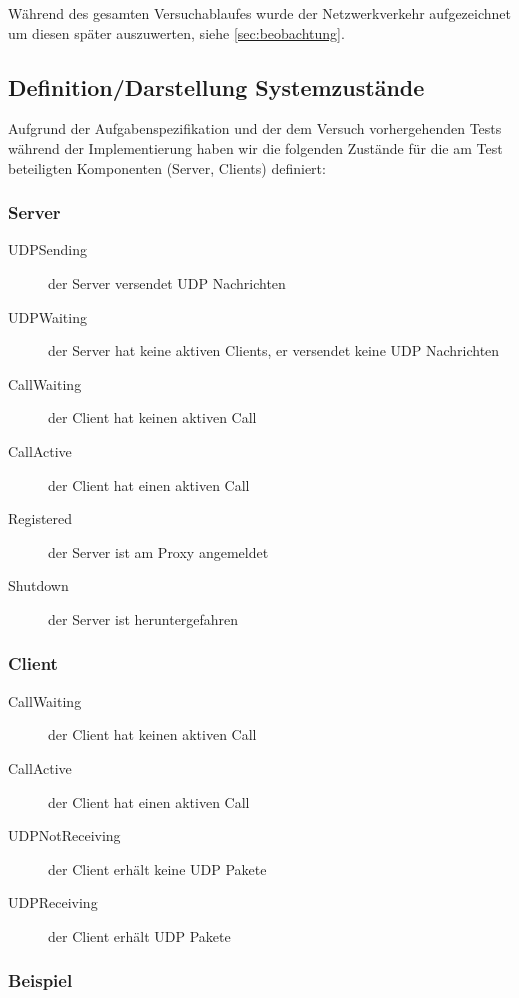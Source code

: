 \documentclass[10pt]{scrartcl}
\begin{document}
Während des gesamten Versuchablaufes wurde der Netzwerkverkehr aufgezeichnet um diesen später auszuwerten, siehe \ref{sec:beobachtung}.

\subsection{Definition/Darstellung Systemzustände}\label{subsec:systemzusatende}
Aufgrund der Aufgabenspezifikation und der dem Versuch vorhergehenden Tests während der Implementierung haben wir die folgenden Zustände für die am Test beteiligten Komponenten (Server, Clients) definiert:


\subsubsection{Server}
	\begin{description}
		\item[UDPSending] der Server versendet UDP Nachrichten
		\item[UDPWaiting] der Server hat keine aktiven Clients, er versendet keine UDP Nachrichten
		\item[CallWaiting] der Client hat keinen aktiven Call
		\item[CallActive] der Client hat einen aktiven Call
		\item[Registered] der Server ist am Proxy angemeldet
		\item[Shutdown] der Server ist heruntergefahren
	\end{description}
	
\subsubsection{Client}	
	\begin{description}
		\item[CallWaiting] der Client hat keinen aktiven Call
		\item[CallActive] der Client hat einen aktiven Call
		\item[UDPNotReceiving] der Client erhält keine UDP Pakete
		\item[UDPReceiving] der Client erhält UDP Pakete
	\end{description}	
	

	

\subsubsection{Beispiel}
\end{document}

